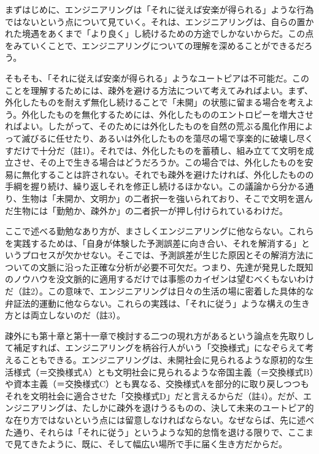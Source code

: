 まずはじめに、エンジニアリングは「それに従えば安楽が得られる」ような行為ではないという点について見ていく。それは、エンジニアリングは、自らの置かれた境遇をあくまで「より良く」し続けるための方途でしかないからだ。この点をみていくことで、エンジニアリングについての理解を深めることができるだろう。

そもそも、「それに従えば安楽が得られる」ようなユートピアは不可能だ。このことを理解するためには、疎外を避ける方法について考えてみればよい。まず、外化したものを耐えず無化し続けることで「未開」の状態に留まる場合を考えよう。外化したものを無化するためには、外化したもののエントロピーを増大させればよい。したがって、そのためには外化したものを自然の荒ぶる風化作用によって滅びるに任せたり、あるいは外化したものを蕩尽の場で享楽的に破壊し尽くすだけで十分だ（註1）。それでは、外化したものを蓄積し、組み立てて文明を成立させ、その上で生きる場合はどうだろうか。この場合では、外化したものを安易に無化することは許されない。それでも疎外を避けたければ、外化したものの手綱を握り続け、繰り返しそれを修正し続けるほかない。この議論から分かる通り、生物は「未開か、文明か」の二者択一を強いられており、そこで文明を選んだ生物には「勤勉か、疎外か」の二者択一が押し付けられているわけだ。

ここで述べる勤勉なあり方が、まさしくエンジニアリングに他ならない。これらを実践するためは、「自身が体験した予測誤差に向き合い、それを解消する」というプロセスが欠かせない。そこでは、予測誤差が生じた原因とその解消方法についての文脈に沿った正確な分析が必要不可欠だ。つまり、先達が発見した既知のノウハウを没文脈的に適用するだけでは事態のカイゼンは望むべくもないわけだ（註2）。この意味で、エンジニアリングは日々の生活の場に密着した具体的な弁証法的運動に他ならない。これらの実践は、「それに従う」ような構えの生き方とは両立しないのだ（註3）。

疎外にも第十章と第十一章で検討する二つの現れ方があるという論点を先取りして補足すれば、エンジニアリングを柄谷行人がいう「交換様式」になぞらえて考えることもできる。エンジニアリングは、未開社会に見られるような原初的な生活様式（＝交換様式A）とも文明社会に見られるような帝国主義（＝交換様式B）や資本主義（＝交換様式C）とも異なる、交換様式Aを部分的に取り戻しつつもそれを文明社会に適合させた「交換様式D」だと言えるからだ（註4）。だが、エンジニアリングは、たしかに疎外を退けうるものの、決して未来のユートピア的な在り方ではないという点には留意しなければならない。なぜならば、先に述べた通り、それらは「それに従う」というような知的怠惰を退ける限りで、ここまで見てきたように、既に、そして幅広い場所で手に届く生き方だからだ。

